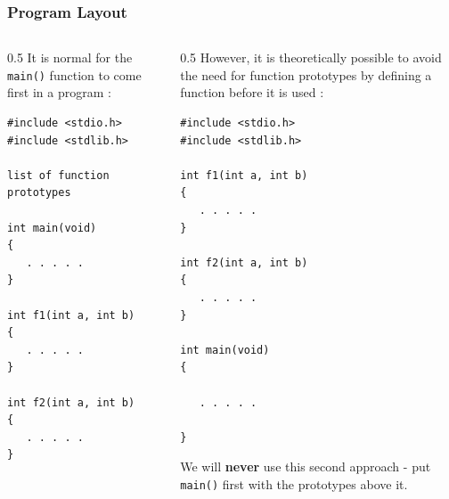 \begin{frame}[fragile]
\frametitle{Program Layout}
\begin{columns}

\begin{column}{0.5\textwidth}
It is normal for the \verb^main()^ function to come
first in a program :
\begin{lstlisting}[style=basicc,numbers=none]
#include <stdio.h>
#include <stdlib.h>

list of function prototypes

int main(void)
{
   . . . . .
}

int f1(int a, int b)
{
   . . . . .
}

int f2(int a, int b)
{
   . . . . .
}
\end{lstlisting}
\end{column}

\pause
\begin{column}{0.5\textwidth}
However, it is theoretically possible to avoid the need for function prototypes
by defining a function before it is used :

\begin{lstlisting}[style=basicc,numbers=none]
#include <stdio.h>
#include <stdlib.h>

int f1(int a, int b)
{
   . . . . .
}

int f2(int a, int b)
{
   . . . . .
}

int main(void)
{

   . . . . .

}
\end{lstlisting}
\pause
{}

We will {\bf never} use this second approach - put {\tt main()} first with the prototypes above it.
\end{column}

\end{columns}
\end{frame}


